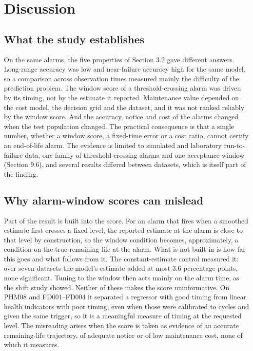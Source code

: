 \documentclass[a4paper,fleqn,doubleblind]{cas-dc}
\begin{document}
\section{Discussion}\label{sec:9}

\subsection{What the study establishes}

On the same alarms, the five properties of Section 3.2 gave different answers. Long-range accuracy was low and near-failure accuracy high for the same model, so a comparison across observation times measured mainly the difficulty of the prediction problem. The window score of a threshold-crossing alarm was driven by its timing, not by the estimate it reported. Maintenance value depended on the cost model, the decision grid and the dataset, and it was not ranked reliably by the window score. And the accuracy, notice and cost of the alarms changed when the test population changed. The practical consequence is that a single number, whether a window score, a fixed-time error or a cost ratio, cannot certify an end-of-life alarm. The evidence is limited to simulated and laboratory run-to-failure data, one family of threshold-crossing alarms and one acceptance window (Section 9.6), and several results differed between datasets, which is itself part of the finding.

\subsection{Why alarm-window scores can mislead}

Part of the result is built into the score. For an alarm that fires when a smoothed estimate first crosses a fixed level, the reported estimate at the alarm is close to that level by construction, so the window condition becomes, approximately, a condition on the true remaining life at the alarm. What is not built in is how far this goes and what follows from it. The constant-estimate control measured it: over seven datasets the model's estimate added at most 3.6 percentage points, none significant. Tuning to the window then acts mainly on the alarm time, as the shift study showed. Neither of these makes the score uninformative. On PHM08 and FD001--FD004 it separated a regressor with good timing from linear health indicators with poor timing, even when those were calibrated to cycles and given the same trigger, so it is a meaningful measure of timing at the requested level. The misreading arises when the score is taken as evidence of an accurate remaining-life trajectory, of adequate notice or of low maintenance cost, none of which it measures.
\end{document}
